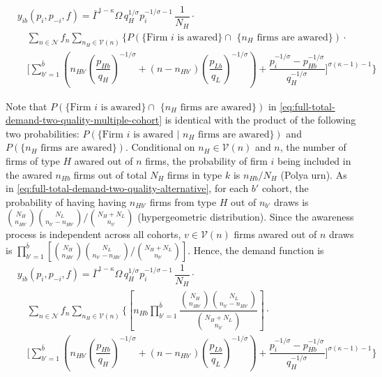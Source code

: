 \documentclass[12pt]{article}
\begin{document}
\begin{equation}\label{eq:full-total-demand-two-quality-multiple-cohort}
\begin{aligned}
& y_{ib}(p_i, p_{-i}, f) 
=  \bar{\Gamma}^{1-\kappa}\Omega \, q_H^{1/\sigma}p_i^{-1/\sigma - 1}\, \dfrac{1}{N_H} \cdot  \\ 
& \quad \sum_{n \in \mathcal{N} } f_n   \sum_{n_H \in \mathcal{V} (n) }  
\Bigg\{
P( \text{\{Firm $i$ is awared\} $\cap$ \{$n_H$ firms are awared\}})
\cdot \\ & \quad
\Bigg[
\sum_{b' = 1}^{\bar b} 
\left(
n_{Hb'} \left( \dfrac{p_{Hb}}{q_{H}}   \right)^{-1/\sigma} +  
(n - n_{Hb'}) \left( \dfrac{p_{Lb}}{q_{L}}   \right)^{-1/\sigma} \right) + 
\dfrac{p_i^{-1/\sigma} - p^{-1/\sigma}_{Hb} }{ q_H^{-1/\sigma }} 
\Bigg]^{\sigma (\kappa - 1)-1} \Bigg\}
\end{aligned}
\end{equation}

Note that $P( \text{\{Firm $i$ is awared\} $\cap$ \{$n_H$ firms are awared\}})$ in \eqref{eq:full-total-demand-two-quality-multiple-cohort} is identical with the product of the following two probabilities: $P( \text{\{Firm $i$ is awared | $n_H$ firms are awared\}})$ and $P( \text{\{$n_H$ firms are awared\}})$. Conditional on $n_{H} \in \mathcal{V}(n)$ and $n$, the number of firms of type $H$ awared out of $n$ firms, the probability of firm $i$ being included in the awared $n_{Hb}$ firms out of total $N_H$ firms in type $k$ is $n_{Hb} / N_{H}$ (Polya urn). As in \eqref{eq:full-total-demand-two-quality-alternative}, for each $b'$ cohort, the probability of having having $n_{Hb'}$ firms from type $H$ out of $n_{b'}$ draws is
$
 {\binom{N_H}{n_{Hb'}} \binom{N_L}{n_{b'} - n_{Hb'}}}/{\binom{N_H + N_L}{n_{b'}}}
$
(hypergeometric distribution). Since the awareness process is independent across all cohorts, $v \in \mathcal{V}(n)$ firms awared out of $n$ draws is $
\prod_{b'=1}^{\bar b} \left[ {\binom{N_H}{n_{Hb'}} \binom{N_L}{n_{b'} - n_{Hb'}}}/{\binom{N_H + N_L}{n_{b'}}} \right]$. Hence, the demand function is
\begin{equation}\label{eq:full-total-demand-two-quality-multiple-cohort-alternative}
\begin{aligned}
& y_{ib}(p_i, p_{-i}, f) 
=  \bar{\Gamma}^{1-\kappa}\Omega \, q_H^{1/\sigma}p_i^{-1/\sigma - 1}\, \dfrac{1}{N_H} \cdot  \\ 
& \quad \sum_{n \in \mathcal{N} } f_n   \sum_{n_H \in \mathcal{V} (n) }  
\Bigg\{
\left[ n_{Hb} \prod_{b'=1}^{\bar b} 
 \dfrac{\binom{N_H}{n_{Hb'}} \binom{N_L}{n_{b'} - n_{Hb'}}}{\binom{N_H + N_L}{n_{b'}}}
\right] \cdot \\ & \quad
\Bigg[
\sum_{b' = 1}^{\bar b} 
\left(
n_{Hb'} \left( \dfrac{p_{Hb}}{q_{H}}   \right)^{-1/\sigma} +  
(n - n_{Hb'}) \left( \dfrac{p_{Lb}}{q_{L}}   \right)^{-1/\sigma} \right) + 
\dfrac{p_i^{-1/\sigma} - p^{-1/\sigma}_{Hb} }{ q_H^{-1/\sigma }} 
\Bigg]^{\sigma (\kappa - 1)-1} \Bigg\}
\end{aligned}
\end{equation}
\end{document}
